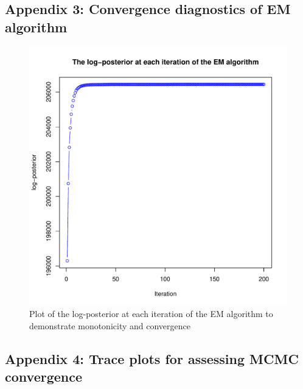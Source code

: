 \documentclass[12pt,english]{article}\usepackage[]{graphicx}\usepackage[]{color}
\makeatletter
\def\maxwidth{ %
  \ifdim\Gin@nat@width>\linewidth
    \linewidth
  \else
    \Gin@nat@width
  \fi
}
\newenvironment{knitrout}{}{} %
\makeatother
\begin{document}
\subsection{Appendix 3: Convergence diagnostics of EM algorithm} \label{app:logposterior}
\begin{figure}[h]
  \centering
\begin{knitrout}
\color{fgcolor}
\includegraphics[width=\maxwidth]{figure/unnamed-chunk-29-1} 

\end{knitrout}

\caption{Plot of the log-posterior at each iteration of the EM algorithm to demonstrate monotonicity and convergence}
  \label{figure::emconvergence}
\end{figure}

\clearpage
\subsection{Appendix 4: Trace plots for assessing MCMC convergence}\label{app:mcmc}
\end{document}
